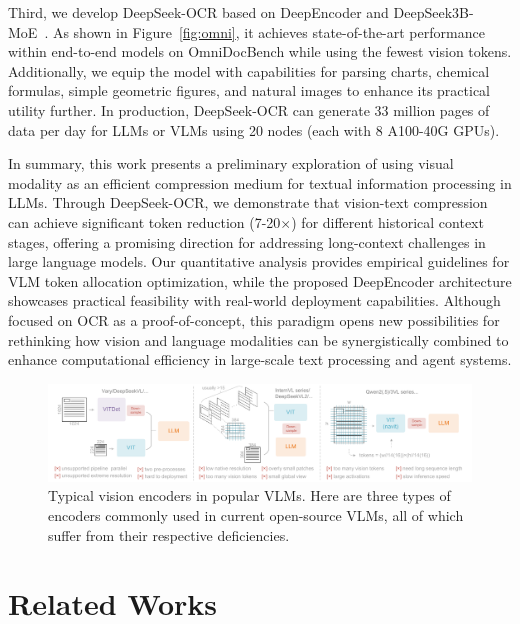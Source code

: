 \documentclass[11pt, a4paper, logo, copyright, nonumbering]{deepseek}
\begin{document}
\begin{CJK*}{UTF8}{gbsn}
Third, we develop DeepSeek-OCR based on DeepEncoder and DeepSeek3B-MoE~\cite{liu2024deepseekv2,liu2024deepseekv3}. As shown in Figure~\ref{fig:omni}, it achieves state-of-the-art performance within end-to-end models on OmniDocBench while using the fewest vision tokens. Additionally, we equip the model with capabilities for parsing charts, chemical formulas, simple geometric figures, and natural images to enhance its practical utility further.  In production, DeepSeek-OCR can generate 33 million pages of data per day for LLMs or VLMs using 20 nodes (each with 8 A100-40G GPUs).

In summary, this work presents a preliminary exploration of using visual modality as an efficient compression medium for textual information processing in LLMs. Through DeepSeek-OCR, we demonstrate that vision-text compression can achieve significant token reduction (7-20$\times$) for different historical context stages, offering a promising direction for addressing long-context challenges in large language models. Our quantitative analysis provides empirical guidelines for VLM token allocation optimization, while the proposed DeepEncoder architecture showcases practical feasibility with real-world deployment capabilities. Although focused on OCR as a proof-of-concept, this paradigm opens new possibilities for rethinking how vision and language modalities can be synergistically combined to enhance computational efficiency in large-scale text processing and agent systems.


\begin{figure}[ht]
	\centering
    \includegraphics[width=1.0\linewidth]{figures/3.pdf}
	\caption{Typical vision encoders in popular VLMs. Here are three types of encoders commonly used in current open-source VLMs, all of which suffer from their respective deficiencies.}
	\label{fig:encoders}
\end{figure}


\section{Related Works}


\end{CJK*}
\end{document}
